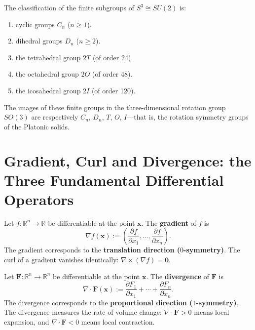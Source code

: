 \begin{property}\label{prop:quaternion_finite_subgroups}
The classification of the finite subgroups of $S^3 \cong SU(2)$ is:
\begin{enumerate}[label=(\roman*)]
    \item cyclic groups $C_n$ ($n \ge 1$).
    \item dihedral groups $D_n$ ($n \ge 2$).
    \item the tetrahedral group $2T$ (of order 24).
    \item the octahedral group $2O$ (of order 48).
    \item the icosahedral group $2I$ (of order 120).
\end{enumerate}
The images of these finite groups in the three-dimensional rotation group $SO(3)$ are respectively $C_n$, $D_n$, $T$, $O$, $I$---that is, the rotation symmetry groups of the Platonic solids.
\end{property}

\section{Gradient, Curl and Divergence: the Three Fundamental Differential Operators}\label{sec:three_operators}
\label{sec:grad_curl_div}

\begin{definition}[Gradient]\label{def:gradient}
Let $f: \mathbb{R}^n \to \mathbb{R}$ be differentiable at the point $\mathbf{x}$. The \textbf{gradient} of $f$ is
\[
\nabla f(\mathbf{x}) := \left( \frac{\partial f}{\partial x_1}, \dots, \frac{\partial f}{\partial x_n} \right).
\]
The gradient corresponds to the \textbf{translation direction ($0$-symmetry)}. The curl of a gradient vanishes identically: $\nabla \times (\nabla f) = \mathbf{0}$.
\end{definition}

\begin{definition}[Divergence]\label{def:divergence}
Let $\mathbf{F}: \mathbb{R}^n \to \mathbb{R}^n$ be differentiable at the point $\mathbf{x}$. The \textbf{divergence} of $\mathbf{F}$ is
\[
\nabla \cdot \mathbf{F}(\mathbf{x}) := \frac{\partial F_1}{\partial x_1} + \cdots + \frac{\partial F_n}{\partial x_n}.
\]
The divergence corresponds to the \textbf{proportional direction ($1$-symmetry)}. The divergence measures the rate of volume change: $\nabla \cdot \mathbf{F} > 0$ means local expansion, and $\nabla \cdot \mathbf{F} < 0$ means local contraction.
\end{definition}


